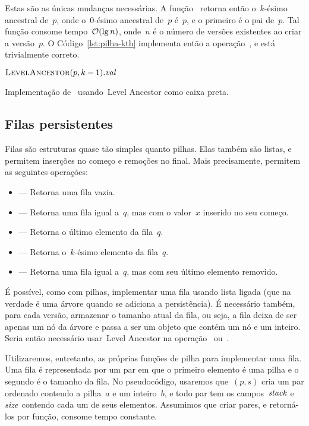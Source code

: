 \documentclass[quali.tex]{subfile}
\begin{document}
Estas são as únicas mudanças necessárias. A função~ retorna então o~\mbox{$k$-ésimo} ancestral de~$p$, onde o~0-ésimo ancestral de~$p$ é~$p$, e o primeiro é o pai de~$p$. Tal função consome tempo~$\mathcal{O}(\lg n)$, onde~$n$ é o número de versões existentes ao criar a versão~$p$.
O Código~\ref{lst:pilha-kth} implementa então a operação~, e está trivialmente correto.

\begin{algorithm}
\begin{algorithmic}[1]
    \State \Return $\Call{LevelAncestor}{p, k - 1}.\V{val}$
\EndFunction
\end{algorithmic}
\caption{Implementação de~ usando~Level Ancestor como caixa preta.} \label{lst:pilha-kth}
\end{algorithm}

\subsection{Filas persistentes}

Filas são estruturas quase tão simples quanto pilhas. Elas também são listas, e permitem inserções no começo e remoções no final. Mais precisamente, permitem as seguintes operações:

\begin{itemize}
	\item {} --- Retorna uma fila vazia.
	\item {} --- Retorna uma fila igual a~$q$, mas com o valor~$x$ inserido no seu começo.
	\item {} --- Retorna o último elemento da fila~$q$.
	\item {} --- Retorna o~\mbox{$k$-ésimo} elemento da fila~$q$.
	\item {} --- Retorna uma fila igual a~$q$, mas com seu último elemento removido.
\end{itemize}

É possível, como com pilhas, implementar uma fila usando lista ligada (que na verdade é uma árvore quando se adiciona a persistência). É necessário também, para cada versão, armazenar o tamanho atual da fila, ou seja, a fila deixa de ser apenas um nó da árvore e passa a ser um objeto que contém um nó e um inteiro. Seria então necessário usar~Level Ancestor na operação~ ou~.

Utilizaremos, entretanto, as próprias funções de pilha para implementar uma fila. Uma fila é representada por um par em que o primeiro elemento é uma pilha e o segundo é o tamanho da fila. No pseudocódigo, usaremos que~$(p,s)$ cria um par ordenado contendo a pilha~$a$ e um inteiro~$b$, e todo par tem os campos~$\mathit{stack}$ e~$\mathit{size}$ contendo cada um de seus elementos.
Assumimos que criar pares, e retorná-los por função, consome tempo constante.
\end{document}
